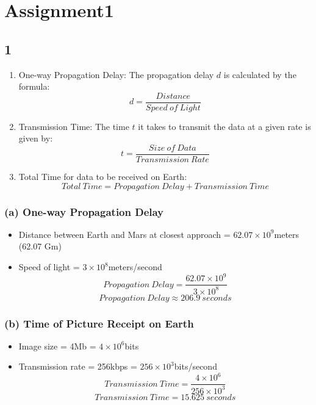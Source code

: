 \documentclass[
]{article}
\author{}
\date{\vspace{-2.5em}}
\providecommand{\tightlist}{%
  \setlength{\itemsep}{0pt}\setlength{\parskip}{0pt}}
\begin{document}
\hypertarget{assignment1}{%
\section{Assignment1}\label{assignment1}}

\hypertarget{section}{%
\subsection{1}\label{section}}

\begin{enumerate}
\def\labelenumi{\arabic{enumi}.}
\item
  One-way Propagation Delay: The propagation delay \(d\) is calculated
  by the formula: \[
  d = \frac{Distance}{Speed~of~Light}
  \]
\item
  Transmission Time: The time \(t\) it takes to transmit the data at a
  given rate is given by: \[
  t = \frac{Size~of~Data}{Transmission~Rate}
  \]
\item
  Total Time for data to be received on Earth: \[
  Total~Time = Propagation~Delay + Transmission~Time
  \]
\end{enumerate}

\hypertarget{a-one-way-propagation-delay}{%
\subsubsection{(a) One-way Propagation
Delay}\label{a-one-way-propagation-delay}}

\begin{itemize}
\tightlist
\item
  Distance between Earth and Mars at closest approach =
  \(62.07 \times 10^{9}\)meters (62.07 Gm)
\item
  Speed of light = \(3 \times 10^{8}\)meters/second \[
  Propagation~Delay = \frac{62.07 \times 10^{9}}{3 \times 10^{8}} 
  \] \[
  Propagation~Delay \approx 206.9~seconds
  \]
\end{itemize}

\hypertarget{b-time-of-picture-receipt-on-earth}{%
\subsubsection{(b) Time of Picture Receipt on
Earth}\label{b-time-of-picture-receipt-on-earth}}

\begin{itemize}
\tightlist
\item
  Image size = 4Mb = \(4 \times 10^{6}\)bits
\item
  Transmission rate = 256kbps = \(256 \times 10^{3}\)bits/second \[
  Transmission~Time = \frac{4 \times 10^{6}}{256 \times 10^{3}} 
  \] \[
  Transmission~Time = 15.625~seconds
  \]
\end{itemize}
\end{document}
